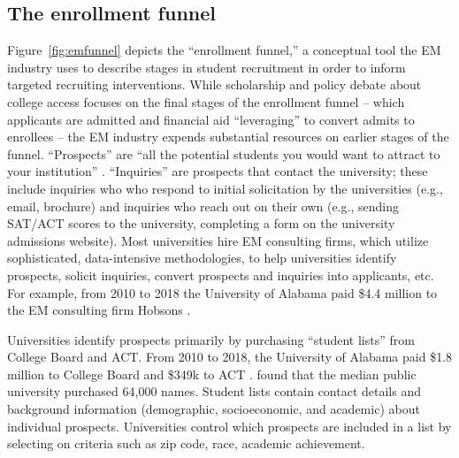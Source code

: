 \documentclass[twoside]{article}
\begin{document}
\subsection*{The enrollment funnel}


Figure~\ref{fig:emfunnel} depicts the ``enrollment funnel,'' a conceptual tool the EM industry uses to describe stages in student recruitment in order to inform targeted recruiting interventions.  While scholarship and policy debate about college access focuses on the final stages of the enrollment funnel -- which applicants are admitted \citep[e.g., ][]{RN3536} and financial aid ``leveraging'' to convert admits to enrollees \citep[e.g., ][]{RN1948} -- the EM industry expends substantial resources on earlier stages of the funnel.  ``Prospects'' are ``all the potential students you would want to attract to your institution'' \citep{RN4322}. ``Inquiries'' are prospects that contact the university; these include inquiries who who respond to initial solicitation by the universities (e.g., email, brochure) and inquiries who reach out on their own (e.g., sending SAT/ACT scores to the university, completing a form on the university admissions website).  Most universities hire EM consulting firms, which utilize sophisticated, data-intensive methodologies, to help universities identify prospects, solicit inquiries, convert prospects and inquiries into applicants, etc. For example, from 2010 to 2018 the University of Alabama paid \$4.4 million to the EM consulting firm Hobsons \citep{RN4035}.




Universities identify prospects primarily by purchasing ``student lists'' from College Board and ACT. From 2010 to 2018, the University of Alabama paid \$1.8 million to College Board and \$349k to ACT \citep{RN4035}.  \cite{RN4314} found that the median public university purchased 64,000 names. Student lists contain contact details and background information (demographic, socioeconomic, and academic) about individual prospects. Universities control which prospects are included in a list by selecting on criteria such as zip code, race, academic achievement.  
\end{document}
